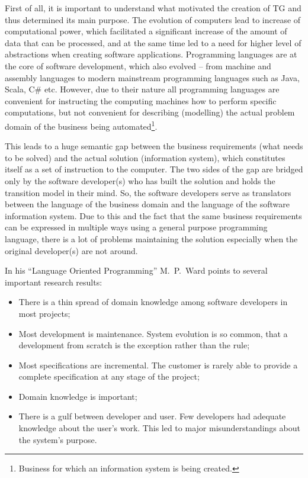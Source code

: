   First of all, it is important to understand what motivated the creation of TG and thus determined its main purpose.
  The evolution of computers lead to increase of computational power, which facilitated a significant increase of the amount of data that can be processed, and at the same time led to a need for higher level of abstractions when creating software applications.
  Programming languages are at the core of software development, which also evolved -- from machine and assembly languages to modern mainstream programming languages such as Java, Scala, C\# etc.
  However, due to their nature all programming languages are convenient for instructing the computing machines how to perform specific computations, but not convenient for describing (modelling) the actual problem domain of the business being automated\footnote{Business for which an information system is being created.}.
  
  This leads to a huge semantic gap between the business requirements (what needs to be solved) and the actual solution (information system), which constitutes itself as a set of instruction to the computer.
  The two sides of the gap are bridged only by the software developer(s) who has built the solution and holds the transition model in their mind.
  So, the software developers serve as translators between the language of the business domain and the language of the software information system.
  Due to this and the fact that the same business requirements can be expressed in multiple ways using a general purpose programming language, there is a lot of problems maintaining the solution especially when the original developer(s) are not around.

  In his ``Language Oriented Programming'' M.~P.~Ward points to several important research results:
  \begin{itemize}
    \item There is a thin spread of domain knowledge among software developers in most projects;    
    \item Most development is maintenance. 
	  System evolution is so common, that a development from scratch is the exception rather than the rule;
    \item Most specifications are incremental. 
	  The customer is rarely able to provide a complete specification at any stage of the project;
    \item Domain knowledge is important;
    \item There is a gulf between developer and user. 
	  Few developers had adequate knowledge about the user's work. 
	  This led to major misunderstandings about the system's purpose.
  \end{itemize}
  
